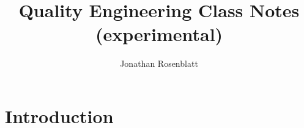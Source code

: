 \documentclass[12pt,a4paper]{report}
\author{Jonathan Rosenblatt}
\title{Quality Engineering Class Notes (experimental)}
\begin{document}
\maketitle

\tableofcontents








\chapter{Introduction}
\end{document}
